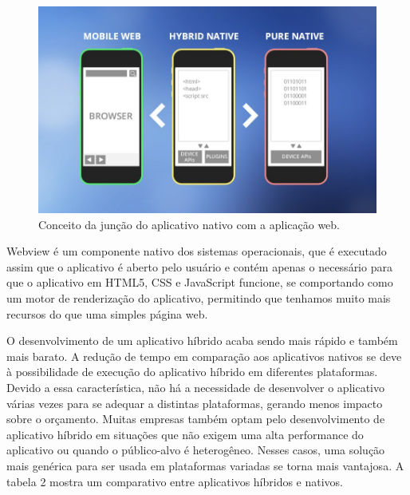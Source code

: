 \begin{figure}[H]
	\caption{\label{fig:figura4}Conceito da junção do aplicativo nativo com a aplicação web.}
	\centering
	\includegraphics[scale=0.5]{imagens/figura4.jpg}
\end{figure}

Webview é um componente nativo dos sistemas operacionais, que é executado assim que o aplicativo é aberto pelo usuário e contém apenas o necessário para que o aplicativo em HTML5, CSS e JavaScript funcione, se comportando como um motor de renderização do aplicativo, permitindo que tenhamos muito mais recursos do que uma simples página web. 

O desenvolvimento de um aplicativo híbrido acaba sendo mais rápido e também mais barato. A redução de tempo em comparação aos aplicativos nativos se deve à possibilidade de execução do aplicativo híbrido em diferentes plataformas. Devido a essa característica, não há a necessidade de desenvolver o aplicativo várias vezes para se adequar a distintas plataformas, gerando menos impacto sobre o orçamento. Muitas empresas também optam pelo desenvolvimento de aplicativo híbrido em situações que não exigem uma alta performance do aplicativo ou quando o público-alvo é heterogêneo. Nesses casos, uma solução mais genérica para ser usada em plataformas variadas se torna mais vantajosa. A tabela 2 mostra um comparativo entre aplicativos híbridos e nativos.

